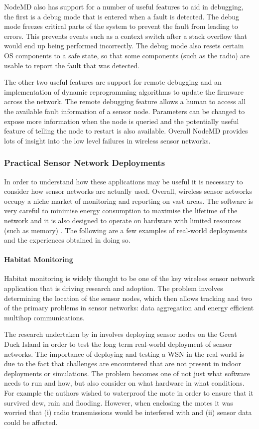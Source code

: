 NodeMD also has support for a number of useful features to aid in debugging, the first is a debug mode that is entered when a fault is detected. The debug mode freezes critical parts of the system to prevent the fault from leading to errors. This prevents events such as a context switch after a stack overflow that would end up being performed incorrectly. The debug mode also resets certain OS components to a safe state, so that some components (such as the radio) are usable to report the fault that was detected.

The other two useful features are support for remote debugging and an implementation of dynamic reprogramming algorithms to update the firmware across the network. The remote debugging feature allows a human to access all the available fault information of a sensor node. Parameters can be changed to expose more information when the node is queried and the potentially useful feature of telling the node to restart is also available. Overall NodeMD provides lots of insight into the low level failures in wireless sensor networks.


\subsubsection{Practical Sensor Network Deployments}
\label{sec:lit-review-practical-experience}
In order to understand how these applications may be useful it is necessary to consider how sensor networks are actually used. Overall, wireless sensor networks occupy a niche market of monitoring and reporting on vast areas. The software is very careful to minimise energy consumption to maximise the lifetime of the network \cite{TankBible} and it is also designed to operate on hardware with limited resources (such as memory) \cite{1368897}. The following are a few examples of real-world deployments and the experiences obtained in doing so.


\paragraph{Habitat Monitoring} Habitat monitoring is widely thought to be one of the key wireless sensor network application that is driving research and adoption. The problem involves determining the location of the sensor nodes, which then allows tracking \cite{Cerpa:2001:HMA:844193.844196} and two of the primary problems in sensor networks: data aggregation and energy efficient multihop communications.

The research undertaken by \citeauthor{SzewczykPMC04} in \cite{SzewczykPMC04} involves deploying sensor nodes on the Great Duck Island in order to test the long term real-world deployment of sensor networks. The importance of deploying and testing a WSN in the real world is due to the fact that challenges are encountered that are not present in indoor deployments or simulations. The problem becomes one of not just what software needs to run and how, but also consider on what hardware in what conditions. For example the authors wished to waterproof the mote in order to ensure that it survived dew, rain and flooding. However, when enclosing the motes it was worried that (i) radio transmissions would be interfered with and (ii) sensor data could be affected.

